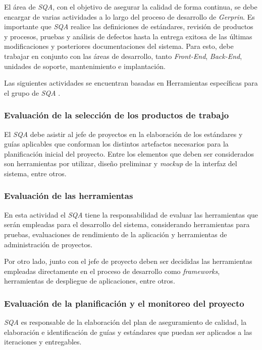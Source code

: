 El área de \textit{SQA}, con el objetivo de asegurar la calidad de forma continua, se debe encargar de varias actividades a lo largo del proceso de desarrollo de \textit{Gerprin}. Es importante que \textit{SQA} realice las definiciones de estándares, revisión de productos y procesos, pruebas y análisis de defectos hasta la entrega exitosa de las últimas modificaciones y posteriores documentaciones del sistema. Para esto, debe trabajar en conjunto con las áreas de desarrollo, tanto \textit{Front-End}, \textit{Back-End}, unidades de soporte, mantenimiento e implantación.

Las siguientes actividades se encuentran basadas en Herramientas específicas para el grupo de \textit{SQA} \citet{web00}.

\subsubsection{Evaluación de la selección de los productos de trabajo}

El \textit{SQA} debe asistir al jefe de proyectos en la elaboración de los estándares y guías aplicables que conforman los distintos artefactos necesarios para la planificación inicial del proyecto. Entre los elementos que deben ser considerados son herramientas por utilizar, diseño preliminar y \textit{mockup} de la interfaz del sistema, entre otros.

\subsubsection{Evaluación de las herramientas} 

En esta actividad el \textit{SQA} tiene la responsabilidad de evaluar las herramientas que serán empleadas para el desarrollo del sistema, considerando herramientas para pruebas, evaluaciones de rendimiento de la aplicación y herramientas de administración de proyectos.

Por otro lado, junto con el jefe de proyecto deben ser decididas las herramientas empleadas directamente en el proceso de desarrollo como \textit{frameworks}, herramientas de despliegue de aplicaciones, entre otros.

\subsubsection{Evaluación de la planificación y el monitoreo del proyecto}

\textit{SQA} es responsable de la elaboración del plan de aseguramiento de calidad, la elaboración e identificación de guías y estándares que puedan ser aplicados a las iteraciones y entregables.

